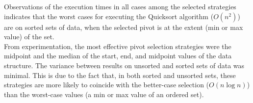 Observations of the execution times in all cases among the selected strategies indicates that the worst cases for executing the Quicksort algorithm ($O(n^2)$) are on sorted sets of data, when the selected pivot is at the extent (min or max value) of the set. \\

From experimentation, the most effective pivot selection strategies were the midpoint and the median of the start, end, and midpoint values of the data structure. The variance between results on unsorted and sorted sets of data was minimal. This is due to the fact that, in both sorted and unsorted sets, these strategies are more likely to coincide with the better-case selection ($O(n \log{n})$) than the worst-case values (a min or max value of an ordered set).